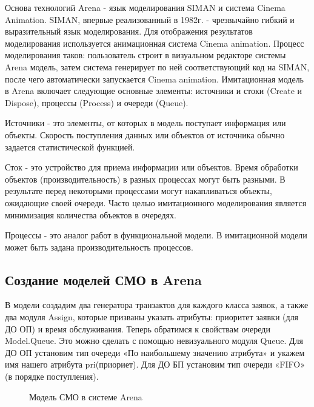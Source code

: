 \documentclass[a4paper,14pt]{report} %
\begin{document}
Основа технологий Arena - язык моделирования SIMAN и система Cinema Animation. SIMAN, впервые реализованный в 1982г. - чрезвычайно гибкий и выразительный язык моделирования. Для отображения результатов моделирования используется анимационная система Cinema animation. Процесс моделирования таков: пользователь строит в визуальном редакторе системы Arena модель, затем система генерирует по ней соответствующий код на SIMAN, после чего автоматически запускается Cinema animation. 
Имитационная модель в Arena включает следующие основные эле­менты: источники и стоки (Create и Dispose), процессы (Process) и очереди (Queue).

Источники - это элементы, от которых в модель поступает информация или объекты. Скорость поступления данных или объектов от источ­ника обычно задается статистической функцией.

Сток - это устройство для приема информации или объектов. Время обработки объектов (производительность) в разных процессах могут быть разными. В результате перед некоторыми процессами могут накапливаться
объекты, ожидающие своей очереди. Часто целью имитационного модели­рования является минимизация количества объектов в очередях.

Процессы - это аналог работ в функциональной модели. В имита­ционной модели может быть задана производительность процессов. 

\subsection{Создание моделей СМО в Arena}
В модели создадим два генератора транзактов для каждого класса заявок, а также два модуля Assign, которые призваны указать атрибуты: приоритет заявки (для ДО ОП) и время обслуживания. Теперь обратимся к свойствам очереди Model.Queue. Это можно сделать с помощью невизуального модуля Queue. Для ДО ОП установим тип очереди «По наибольшему значению атрибута» и укажем имя нашего атрибута pri(приориет). Для ДО БП  установим тип очереди «FIFO» (в порядке поступления).

\begin{figure}[h] %
\caption{Модель СМО в системе Arena}
\label{ris:model_Arena}
\end{figure} %
\end{document}
